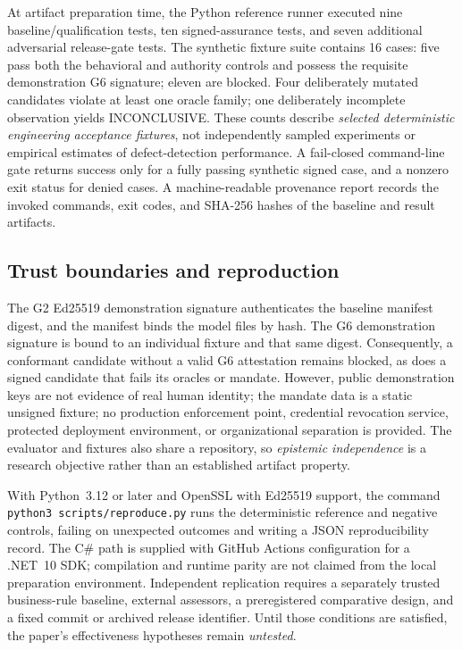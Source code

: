 \documentclass[11pt,a4paper]{article}
\newcommand{\INC}{\textsf{INCONCLUSIVE}}
\begin{document}
At artifact preparation time, the Python reference runner executed nine baseline/qualification tests, ten signed-assurance tests, and seven additional adversarial release-gate tests. The synthetic fixture suite contains 16 cases: five pass both the behavioral and authority controls and possess the requisite demonstration G6 signature; eleven are blocked. Four deliberately mutated candidates violate at least one oracle family; one deliberately incomplete observation yields \INC{}. These counts describe \emph{selected deterministic engineering acceptance fixtures}, not independently sampled experiments or empirical estimates of defect-detection performance. A fail-closed command-line gate returns success only for a fully passing synthetic signed case, and a nonzero exit status for denied cases. A machine-readable provenance report records the invoked commands, exit codes, and SHA-256 hashes of the baseline and result artifacts.

\subsection{Trust boundaries and reproduction}
The G2 Ed25519 demonstration signature authenticates the baseline manifest digest, and the manifest binds the model files by hash. The G6 demonstration signature is bound to an individual fixture and that same digest. Consequently, a conformant candidate without a valid G6 attestation remains blocked, as does a signed candidate that fails its oracles or mandate. However, public demonstration keys are not evidence of real human identity; the mandate data is a static unsigned fixture; no production enforcement point, credential revocation service, protected deployment environment, or organizational separation is provided. The evaluator and fixtures also share a repository, so \emph{epistemic independence} is a research objective rather than an established artifact property.


With Python~3.12 or later and OpenSSL with Ed25519 support, the command \texttt{python3 scripts/reproduce.py} runs the deterministic reference and negative controls, failing on unexpected outcomes and writing a JSON reproducibility record. The C\# path is supplied with GitHub Actions configuration for a .NET~10 SDK; compilation and runtime parity are not claimed from the local preparation environment. Independent replication requires a separately trusted business-rule baseline, external assessors, a preregistered comparative design, and a fixed commit or archived release identifier. Until those conditions are satisfied, the paper's effectiveness hypotheses remain \emph{untested}.
\end{document}
